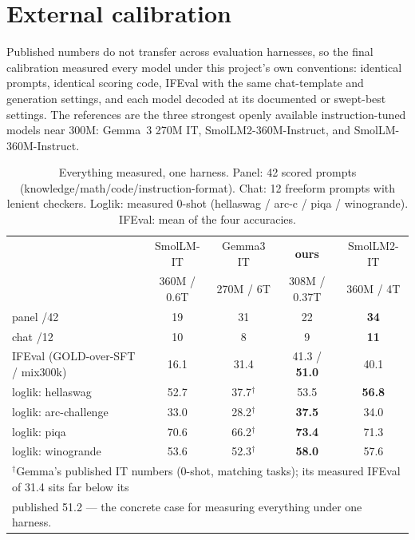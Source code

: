 \section{External calibration}
\label{sec:calibration}

Published numbers do not transfer across evaluation harnesses, so the
final calibration measured every model under this project's own
conventions: identical prompts, identical scoring code, IFEval with the
same chat-template and generation settings, and each model decoded at
its documented or swept-best settings. The references are the three
strongest openly available instruction-tuned models near 300M:
Gemma~3 270M IT, SmolLM2-360M-Instruct, and SmolLM-360M-Instruct.

\begin{table}[h]
\centering
\small
\caption{Everything measured, one harness. Panel: 42 scored prompts
(knowledge/math/code/instruction-format). Chat: 12 freeform prompts with
lenient checkers. Loglik: measured 0-shot (hellaswag / arc-c / piqa /
winogrande). IFEval: mean of the four accuracies.}
\label{tab:calibration}
\begin{tabular}{lcccc}
\toprule
 & SmolLM-IT & Gemma3 IT & \textbf{ours} & SmolLM2-IT \\
 & 360M / 0.6T & 270M / 6T & 308M / 0.37T & 360M / 4T \\
\midrule
panel /42 & 19 & 31 & 22 & \textbf{34} \\
chat /12 & 10 & 8 & 9 & \textbf{11} \\
IFEval (GOLD-over-SFT / mix300k) & 16.1 & 31.4 & 41.3 / \textbf{51.0} & 40.1 \\
loglik: hellaswag & 52.7 & 37.7$^{\dagger}$ & 53.5 & \textbf{56.8} \\
loglik: arc-challenge & 33.0 & 28.2$^{\dagger}$ & \textbf{37.5} & 34.0 \\
loglik: piqa & 70.6 & 66.2$^{\dagger}$ & \textbf{73.4} & 71.3 \\
loglik: winogrande & 53.6 & 52.3$^{\dagger}$ & \textbf{58.0} & 57.6 \\
\bottomrule
\multicolumn{5}{l}{\footnotesize $^{\dagger}$Gemma's published IT numbers
(0-shot, matching tasks); its measured IFEval of 31.4 sits far below its}\\
\multicolumn{5}{l}{\footnotesize published 51.2 --- the concrete case for
measuring everything under one harness.}
\end{tabular}
\end{table}

